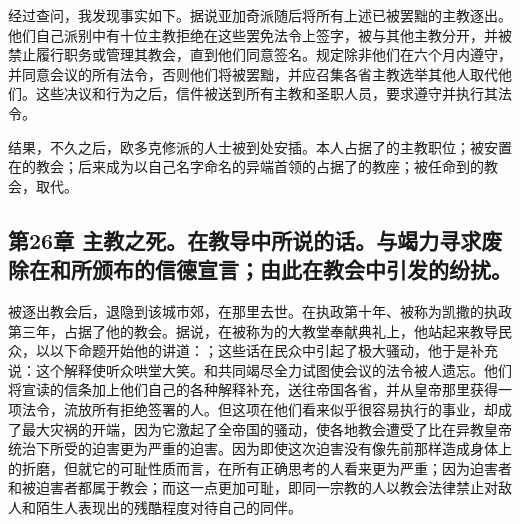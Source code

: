 经过查问，我发现事实如下。据说亚加奇派随后将所有上述已被罢黜的主教逐出。他们自己派别中有十位主教拒绝在这些罢免法令上签字，被与其他主教分开，并被禁止履行职务或管理其教会，直到他们同意签名。规定除非他们在六个月内遵守，并同意会议的所有法令，否则他们将被罢黜，并应召集各省主教选举其他人取代他们。这些决议和行为之后，信件被送到所有主教和圣职人员，要求遵守并执行其法令。\par

结果，不久之后，欧多克修派的人士被到处安插。本人占据了的主教职位；被安置在的教会；后来成为以自己名字命名的异端首领的占据了的教座；被任命到的教会，取代。\par


\subsection{第26章 主教之死。在教导中所说的话。与竭力寻求废除在和所颁布的信德宣言；由此在教会中引发的纷扰。}

被逐出教会后，退隐到该城市郊，在那里去世。在执政第十年、被称为凯撒的执政第三年，占据了他的教会。据说，在被称为的大教堂奉献典礼上，他站起来教导民众，以以下命题开始他的讲道：；这些话在民众中引起了极大骚动，他于是补充说：这个解释使听众哄堂大笑。和共同竭尽全力试图使会议的法令被人遗忘。他们将宣读的信条加上他们自己的各种解释补充，送往帝国各省，并从皇帝那里获得一项法令，流放所有拒绝签署的人。但这项在他们看来似乎很容易执行的事业，却成了最大灾祸的开端，因为它激起了全帝国的骚动，使各地教会遭受了比在异教皇帝统治下所受的迫害更为严重的迫害。因为即使这次迫害没有像先前那样造成身体上的折磨，但就它的可耻性质而言，在所有正确思考的人看来更为严重；因为迫害者和被迫害者都属于教会；而这一点更加可耻，即同一宗教的人以教会法律禁止对敌人和陌生人表现出的残酷程度对待自己的同伴。\par


